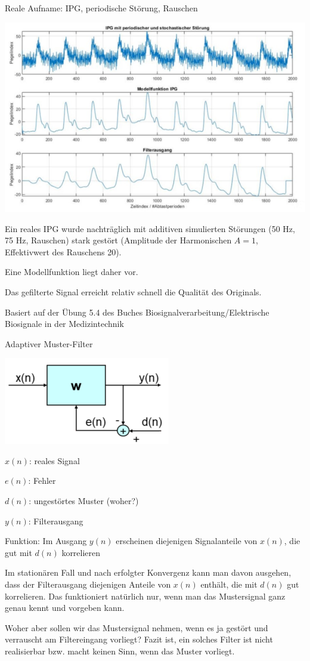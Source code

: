 \documentclass[a4paper]{article}
\begin{document}
\begin{multicols}{3}
  Reale Aufname: IPG, periodische Störung, Rauschen

  \begin{itemize*}
    \item \includegraphics[width=.5\linewidth]{Assets/Biosignalverarbeitung-adaptiver-filter-reale-aufnahme.png}
    \item Ein reales IPG wurde nachträglich mit additiven simulierten Störungen (50 Hz, 75 Hz, Rauschen) stark gestört (Amplitude der Harmonischen $A=1$, Effektivwert des Rauschens 20).
    \item Eine Modellfunktion liegt daher vor.
    \item Das gefilterte Signal erreicht relativ schnell die Qualität des Originals.
    \item Basiert auf der Übung 5.4 des Buches Biosignalverarbeitung/Elektrische Biosignale in der Medizintechnik
  \end{itemize*}

  Adaptiver Muster-Filter

  \begin{itemize*}
    \item \includegraphics[width=.5\linewidth]{Assets/Biosignalverarbeitung-adaptiver-filter-aufbau.png}
    \item $x(n)$: reales Signal
    \item $e(n)$: Fehler
    \item $d(n)$: ungestörtes Muster (woher?)
    \item $y(n)$: Filterausgang
    \item Funktion: Im Ausgang $y(n)$ erscheinen diejenigen Signalanteile von $x(n)$, die gut mit $d(n)$ korrelieren
    \item Im stationären Fall und nach erfolgter Konvergenz kann man davon ausgehen, dass der Filterausgang diejenigen Anteile von $x(n)$ enthält, die mit $d(n)$ gut korrelieren. Das funktioniert natürlich nur, wenn man das Mustersignal ganz genau kennt und vorgeben kann.
    \item Woher aber sollen wir das Mustersignal nehmen, wenn es ja gestört und verrauscht am Filtereingang vorliegt? Fazit ist, ein solches Filter ist nicht realisierbar bzw. macht keinen Sinn, wenn das Muster vorliegt.
  \end{itemize*}


\end{multicols}
\end{document}

